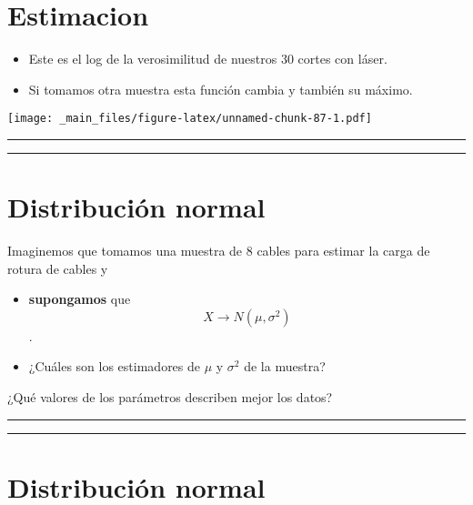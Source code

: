 \documentclass[
]{book}
\begin{document}
\hypertarget{estimacion-1}{%
\section{Estimacion}\label{estimacion-1}}

\begin{itemize}
\item
  Este es el log de la verosimilitud de nuestros 30 cortes con láser.
\item
  Si tomamos otra muestra esta función cambia y también su máximo.
\end{itemize}

\texttt{[image: \_main\_files/figure-latex/unnamed-chunk-87-1.pdf]}

\begin{center}\rule{0.5\linewidth}{0.5pt}\end{center}

\begin{center}\rule{0.5\linewidth}{0.5pt}\end{center}

\hypertarget{distribuciuxf3n-normal-9}{%
\section{Distribución normal}\label{distribuciuxf3n-normal-9}}

Imaginemos que tomamos una muestra de \(8\) cables para estimar la carga de rotura de cables y

\begin{itemize}
\item
  \textbf{supongamos} que \[X \rightarrow N(\mu, \sigma^2)\].
\item
  ¿Cuáles son los estimadores de \(\mu\) y \(\sigma^2\) de la muestra?
\end{itemize}

¿Qué valores de los parámetros describen mejor los datos?

\begin{center}\rule{0.5\linewidth}{0.5pt}\end{center}

\begin{center}\rule{0.5\linewidth}{0.5pt}\end{center}

\hypertarget{distribuciuxf3n-normal-10}{%
\section{Distribución normal}\label{distribuciuxf3n-normal-10}}
\end{document}
